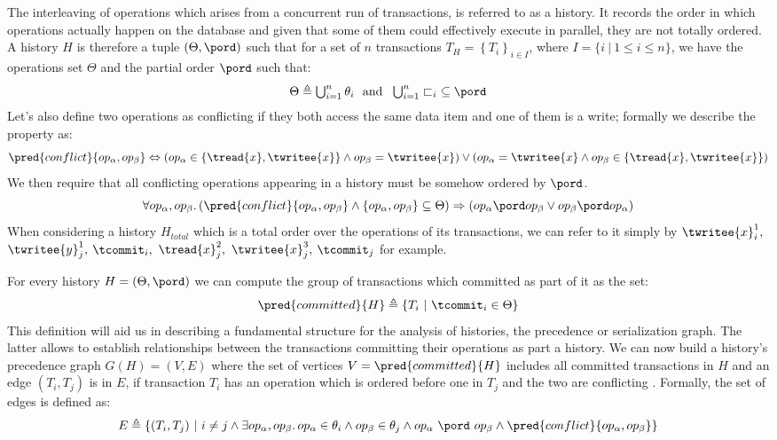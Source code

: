 The interleaving of operations which arises from a concurrent run of transactions, is referred to as a history. It records the order in which operations actually happen on the database and given that some of them could effectively execute in parallel, they are not totally ordered. A history $H$ \cite{ccontrol} is therefore a tuple $(\Theta, \pord)$ such that for a set of $n$ transactions $T_H = \left\lbrace T_i \right\rbrace_{i \in I}$, where $I = \{ i\ |\ 1 \leq i \leq n\}$, we have the operations set $\Theta$ and the partial order $\pord$ such that:
\[
	\begin{array}{c}
		\Theta \triangleq \bigcup_{i = 1}^{n} \theta_i\
		\text{ and }\
		\bigcup_{i = 1}^{n} \sqsubset_i\ \subseteq \pord
	\end{array}
\]
Let's also define two operations as conflicting if they both access the same data item and one of them is a write; formally we describe the property as:
\[
	\pred{conflict}{op_\alpha, op_\beta} \Leftrightarrow \left( op_\alpha \in \{ \tread{x}, \twritee{x} \} \land op_\beta = \twritee{x} \right) \lor \left( op_\alpha = \twritee{x} \land op_\beta \in \{ \tread{x}, \twritee{x} \} \right)
\]
We then require that all conflicting operations appearing in a history must be somehow ordered by $\pord$.
\[
	\forall op_\alpha, op_\beta \ldotp (\pred{conflict}{op_\alpha, op_\beta} \land\left\lbrace op_\alpha, op_\beta \right\rbrace \subseteq \Theta) \Rightarrow (op_\alpha \pord op_\beta \lor op_\beta \pord op_\alpha)
\]
When considering a history $H_{total}$ which is a total order over the operations of its transactions, we can refer to it simply by $\twritee{x}_i^1, $ $\twritee{y}_j^1, $ $\tcommit_i, $ $\tread{x}_j^2, $ $\twritee{x}_j^3, $ $\tcommit_j$ for example.

For every history $H = (\Theta, \pord)$ we can compute the group of transactions which committed as part of it as the set:
\[
	\pred{committed}{H} \triangleq \{ T_i\ |\ \tcommit_i \in \Theta \}
\]
This definition will aid us in describing a fundamental structure for the analysis of histories, the precedence or serialization graph. The latter allows to establish relationships between the transactions committing their operations as part a history. We can now build a history's precedence graph $G(H) = (V, E)$ where the set of vertices $V = \pred{committed}{H}$ includes all committed transactions in $H$ and an edge $(T_i, T_j)$ is in $E$, if transaction $T_i$ has an operation which is ordered before one in $T_j$ and the two are conflicting \cite{dbconcepts}. Formally, the set of edges is defined as:
\[
	E \triangleq \{ (T_i, T_j)\ |\ i \neq j \land \exists op_\alpha, op_\beta \ldotp op_\alpha \in \theta_i \land op_\beta \in \theta_j \land op_\alpha\ \pord\ op_\beta \land \pred{conflict}{op_\alpha, op_\beta} \}
\]

